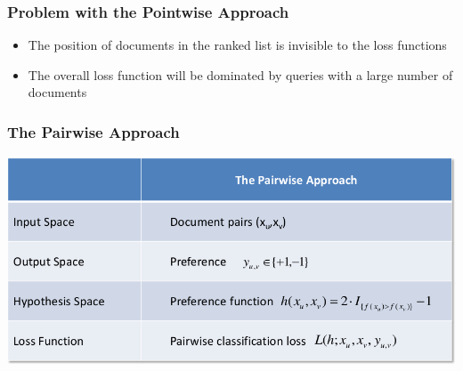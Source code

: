 \documentclass{beamer}
\begin{document}
\begin{frame}
    \frametitle{Problem with the Pointwise Approach}
    \begin{block}{}
        \begin{itemize}
        \item The position of documents in the ranked list is invisible to the
            loss functions
        \item The overall loss function will be dominated by queries with a
            large number of documents
        \end{itemize}
    \end{block}
\end{frame}

\begin{frame}
    \frametitle{The Pairwise Approach}
    \centering
    \includegraphics[width=\linewidth]{pairwise}
\end{frame}
\end{document}
